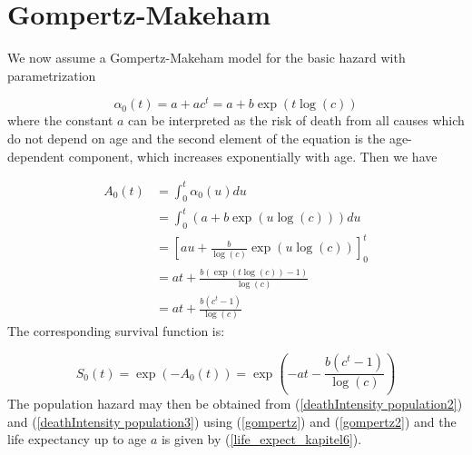             



\section{Gompertz-Makeham}


We now assume a Gompertz-Makeham model for the basic hazard with parametrization

\begin{equation}
    \alpha_0(t) = a + ac^t = a + b\exp(t\log(c))
    \label{gompertz}
\end{equation}
where the constant $a$ can be interpreted as the risk of death from all causes which do not depend on age and the second element of the equation is the age-dependent component, which increases exponentially with age.
Then we have 


\begin{equation}
    \begin{split}
        A_{0}(t) &= \int_{0}^{t} \alpha_{0}(u)du \\
                 &= \int_{0}^{t} (a + b\exp(u\log(c)))du \\
                 &= \left[au + \frac{b}{\log(c)}\exp(u\log(c))\right]_0^t \\
                 &= at + \frac{b(\exp(t\log(c))-1)}{\log(c)}\\
                 &= at + \frac{b(c^t-1)}{\log(c)}
    \label{gompertz2}             
    \end{split}
\end{equation}
The corresponding survival function is:

\begin{equation}
    S_{0}(t) = \exp(-A_{0}(t)) = \exp( -at - \frac{b(c^t - 1)}{\log(c)})
\end{equation}
The population hazard may then be obtained from (\ref{deathIntensity population2}) and (\ref{deathIntensity population3}) using (\ref{gompertz}) and (\ref{gompertz2}) and the life expectancy up to age $a$ is given by (\ref{life_expect_kapitel6}).







